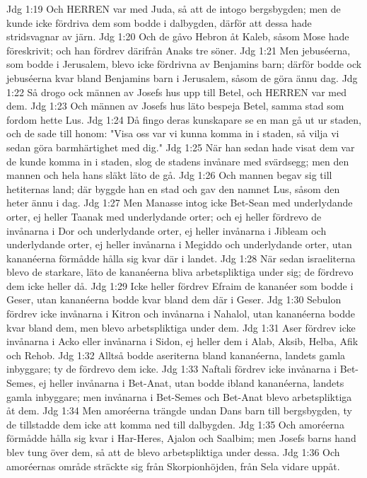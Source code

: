 Jdg 1:19  Och HERREN var med Juda, så att de intogo bergsbygden; men de kunde icke fördriva dem som bodde i dalbygden, därför att dessa hade stridsvagnar av järn.
Jdg 1:20  Och de gåvo Hebron åt Kaleb, såsom Mose hade föreskrivit; och han fördrev därifrån Anaks tre söner.
Jdg 1:21  Men jebuséerna, som bodde i Jerusalem, blevo icke fördrivna av Benjamins barn; därför bodde ock jebuséerna kvar bland Benjamins barn i Jerusalem, såsom de göra ännu dag.
Jdg 1:22  Så drogo ock männen av Josefs hus upp till Betel, och HERREN var med dem.
Jdg 1:23  Och männen av Josefs hus läto bespeja Betel, samma stad som fordom hette Lus.
Jdg 1:24  Då fingo deras kunskapare se en man gå ut ur staden, och de sade till honom: "Visa oss var vi kunna komma in i staden, så vilja vi sedan göra barmhärtighet med dig."
Jdg 1:25  När han sedan hade visat dem var de kunde komma in i staden, slog de stadens invånare med svärdsegg; men den mannen och hela hans släkt läto de gå.
Jdg 1:26  Och mannen begav sig till hetiternas land; där byggde han en stad och gav den namnet Lus, såsom den heter ännu i dag.
Jdg 1:27  Men Manasse intog icke Bet-Sean med underlydande orter, ej heller Taanak med underlydande orter; och ej heller fördrevo de invånarna i Dor och underlydande orter, ej heller invånarna i Jibleam och underlydande orter, ej heller invånarna i Megiddo och underlydande orter, utan kananéerna förmådde hålla sig kvar där i landet.
Jdg 1:28  När sedan israeliterna blevo de starkare, läto de kananéerna bliva arbetspliktiga under sig; de fördrevo dem icke heller då.
Jdg 1:29  Icke heller fördrev Efraim de kananéer som bodde i Geser, utan kananéerna bodde kvar bland dem där i Geser.
Jdg 1:30  Sebulon fördrev icke invånarna i Kitron och invånarna i Nahalol, utan kananéerna bodde kvar bland dem, men blevo arbetspliktiga under dem.
Jdg 1:31  Aser fördrev icke invånarna i Acko eller invånarna i Sidon, ej heller dem i Alab, Aksib, Helba, Afik och Rehob.
Jdg 1:32  Alltså bodde aseriterna bland kananéerna, landets gamla inbyggare; ty de fördrevo dem icke.
Jdg 1:33  Naftali fördrev icke invånarna i Bet-Semes, ej heller invånarna i Bet-Anat, utan bodde ibland kananéerna, landets gamla inbyggare; men invånarna i Bet-Semes och Bet-Anat blevo arbetspliktiga åt dem.
Jdg 1:34  Men amoréerna trängde undan Dans barn till bergsbygden, ty de tillstadde dem icke att komma ned till dalbygden.
Jdg 1:35  Och amoréerna förmådde hålla sig kvar i Har-Heres, Ajalon och Saalbim; men Josefs barns hand blev tung över dem, så att de blevo arbetspliktiga under dessa.
Jdg 1:36  Och amoréernas område sträckte sig från Skorpionhöjden, från Sela vidare uppåt.

